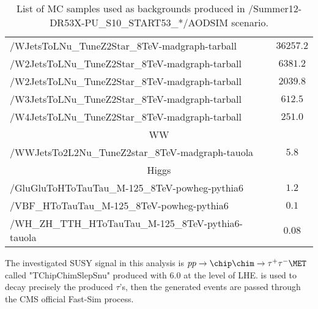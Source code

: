 \begin{table}[!Hhtb]
\begin{center}
{\begin{tabular}{|l|c|}
/WJetsToLNu\_TuneZ2Star\_8TeV-madgraph-tarball          &  $36257.2$              \\
/W2JetsToLNu\_TuneZ2Star\_8TeV-madgraph-tarball         &  $6381.2$               \\
/W2JetsToLNu\_TuneZ2Star\_8TeV-madgraph-tarball         &  $2039.8$               \\
/W3JetsToLNu\_TuneZ2Star\_8TeV-madgraph-tarball         &  $612.5$               \\
/W4JetsToLNu\_TuneZ2Star\_8TeV-madgraph-tarball         &  $251.0$                \\
\hline
\multicolumn{2}{|c|}{WW}\\
\hline
/WWJetsTo2L2Nu\_TuneZ2star\_8TeV-madgraph-tauola        &  $5.8$                \\

\hline
\multicolumn{2}{|c|}{Higgs}\\
\hline
/GluGluToHToTauTau\_M-125\_8TeV-powheg-pythia6          &  $1.2$                \\
/VBF\_HToTauTau\_M-125\_8TeV-powheg-pythia6             &  $0.1$                \\
/WH\_ZH\_TTH\_HToTauTau\_M-125\_8TeV-pythia6-tauola     &  $0.08$\\

\hline

\end{tabular}
}
\end{center}

\caption{List of MC samples used as backgrounds produced in /Summer12-DR53X-PU\_S10\_START53\_*/AODSIM scenario.}
\label{Tab.MCSamples}
\end{table}

The investigated SUSY signal in this analysis is {\small $pp \rightarrow \chip \chim \rightarrow \tau^+ \tau^- \MET$} called {\small "TChipChimSlepSnu"} produced with \PYTHIA $6.0$ at the level of LHE. \TAUOLA is used to decay precisely the produced $\tau$'s, then the generated events are
passed through the CMS official Fast-Sim process.

